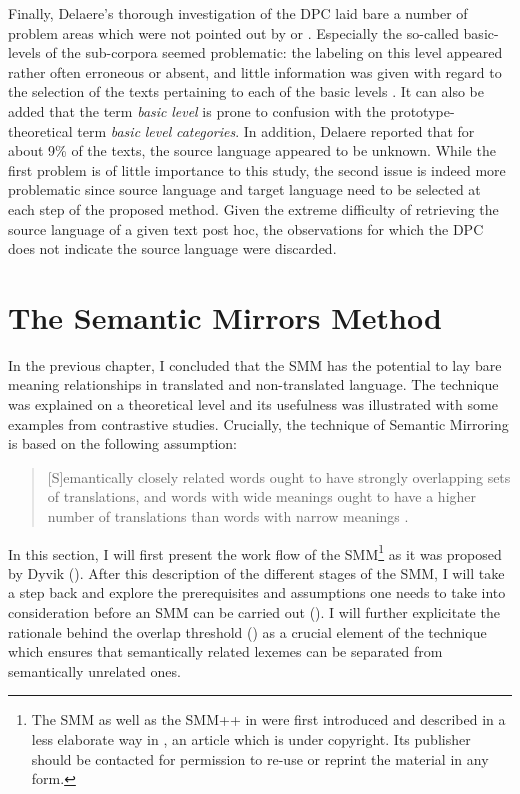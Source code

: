 Finally, Delaere’s thorough investigation of the DPC laid bare a number of problem areas which were not pointed out by \citet{spyns_dutch_2013} or \citet{macken_dutch_2011}. Especially the so-called basic-levels of the sub-corpora seemed problematic: the labeling on this level appeared rather often erroneous or absent, and little information was given with regard to the selection of the texts pertaining to each of the basic levels \citep[52]{delaere_translations_2015}. It can also be added that the term \textit{basic} \textit{level} is prone to confusion with the prototype-theoretical term \textit{basic} \textit{level} \textit{categories}. In addition, Delaere reported that for about 9\% of the texts, the source language appeared to be unknown. While the first problem is of little importance to this study, the second issue is indeed more problematic since source language and target language need to be selected at each step of the proposed method. Given the extreme difficulty of retrieving the source language of a given text post hoc, the observations for which the DPC does not indicate the source language were discarded.


\section{The Semantic Mirrors Method}\label{sec:3.4}
In the previous chapter, I concluded that the SMM has the potential to lay bare meaning relationships in translated and non-translated language. The technique was explained on a theoretical level and its usefulness was illustrated with some examples from contrastive studies. Crucially, the technique of Semantic Mirroring is based on the following assumption:

\begin{quote}
[S]emantically closely related words ought to have strongly overlapping sets of translations, and words with wide meanings ought to have a higher number of translations than words with narrow meanings \citep[311]{aijmer_translations_2004}.
\end{quote}

In this section, I will first present the work flow of the SMM\footnote{The SMM as well as the SMM++ in  were first introduced and described in a less elaborate way in \citet{VandevoordeEtAl2017}, an article which is under copyright. Its publisher should be contacted for permission to re-use or reprint the material in any form.} as it was proposed by Dyvik (). After this description of the different stages of the SMM, I will take a step back and explore the prerequisites and assumptions one needs to take into consideration before an SMM can be carried out (). I will further explicitate the rationale behind the overlap threshold () as a crucial element of the technique which ensures that semantically related lexemes can be separated from semantically unrelated ones.


